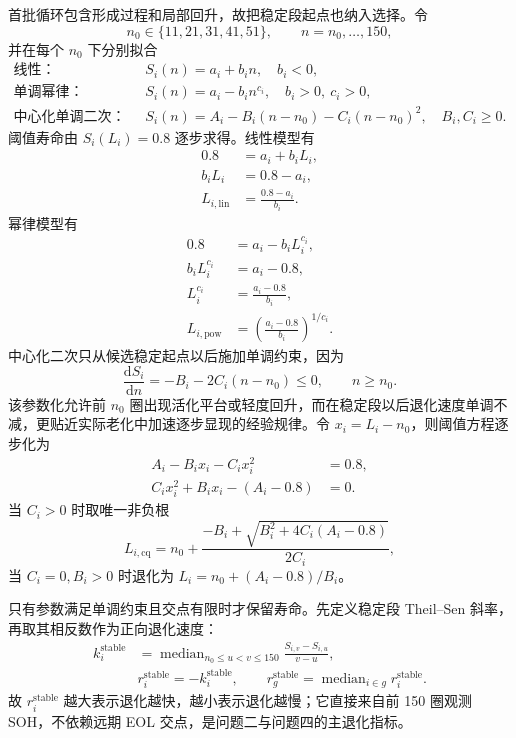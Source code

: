 \documentclass[withoutpreface]{cumcmthesis}
\begin{document}
首批循环包含形成过程和局部回升，故把稳定段起点也纳入选择。令
\[
n_0\in\{11,21,31,41,51\},\qquad n=n_0,\ldots,150,
\]
并在每个 $n_0$ 下分别拟合
\begin{align}
\text{线性：}\quad &S_i(n)=a_i+b_i n,\quad b_i<0,\\
\text{单调幂律：}\quad &S_i(n)=a_i-b_i n^{c_i},\quad b_i>0,\ c_i>0,\\
\text{中心化单调二次：}\quad
&S_i(n)=A_i-B_i(n-n_0)-C_i(n-n_0)^2,\quad B_i,C_i\ge0.
\end{align}
阈值寿命由 $S_i(L_i)=0.8$ 逐步求得。线性模型有
\begin{align}
0.8&=a_i+b_iL_i,\\
b_iL_i&=0.8-a_i,\\
L_{i,\mathrm{lin}}&=\frac{0.8-a_i}{b_i}.
\end{align}
幂律模型有
\begin{align}
0.8&=a_i-b_iL_i^{c_i},\\
b_iL_i^{c_i}&=a_i-0.8,\\
L_i^{c_i}&=\frac{a_i-0.8}{b_i},\\
L_{i,\mathrm{pow}}&=\left(\frac{a_i-0.8}{b_i}\right)^{1/c_i}.
\end{align}
中心化二次只从候选稳定起点以后施加单调约束，因为
\begin{equation}
\frac{\mathrm dS_i}{\mathrm dn}=-B_i-2C_i(n-n_0)\le0,\qquad n\ge n_0.
\end{equation}
该参数化允许前 $n_0$ 圈出现活化平台或轻度回升，而在稳定段以后退化速度单调不减，更贴近实际老化中加速逐步显现的经验规律。令 $x_i=L_i-n_0$，则阈值方程逐步化为
\begin{align}
A_i-B_ix_i-C_ix_i^2&=0.8,\\
C_ix_i^2+B_ix_i-(A_i-0.8)&=0.
\end{align}
当 $C_i>0$ 时取唯一非负根
\begin{equation}
\boxed{L_{i,\mathrm{cq}}=n_0+
\frac{-B_i+\sqrt{B_i^2+4C_i(A_i-0.8)}}{2C_i}},
\end{equation}
当 $C_i=0,B_i>0$ 时退化为 $L_i=n_0+(A_i-0.8)/B_i$。

只有参数满足单调约束且交点有限时才保留寿命。先定义稳定段 Theil--Sen 斜率，再取其相反数作为正向退化速度：
\begin{align}
k_i^{\mathrm{stable}}
&=\operatorname{median}_{n_0\le u<v\le150}
\frac{S_{i,v}-S_{i,u}}{v-u},\\
&\boxed{r_i^{\mathrm{stable}}=-k_i^{\mathrm{stable}}},\qquad
r_g^{\mathrm{stable}}=\operatorname{median}_{i\in g}r_i^{\mathrm{stable}}.
\end{align}
故 $r_i^{\mathrm{stable}}$ 越大表示退化越快，越小表示退化越慢；它直接来自前 150 圈观测 SOH，不依赖远期 EOL 交点，是问题二与问题四的主退化指标。
\end{document}
